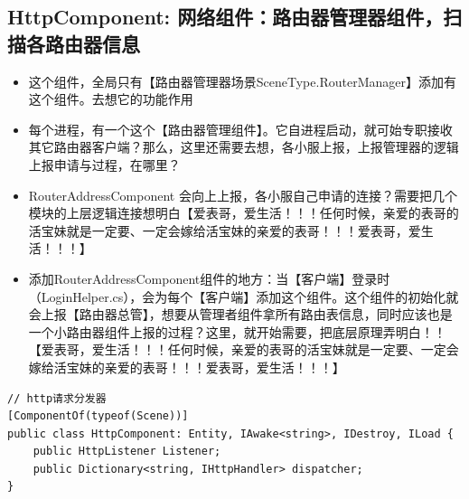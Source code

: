 \documentclass[9pt, b5paper]{article}
\begin{document}
\subsection{HttpComponent: 网络组件：路由器管理器组件，扫描各路由器信息}
\label{sec:org6ad02ac}
\begin{itemize}
\item 这个组件，全局只有【路由器管理器场景SceneType.RouterManager】添加有这个组件。去想它的功能作用
\item 每个进程，有一个这个【路由器管理组件】。它自进程启动，就可始专职接收其它路由器客户端？那么，这里还需要去想，各小服上报，上报管理器的逻辑上报申请与过程，在哪里？
\item RouterAddressComponent 会向上上报，各小服自己申请的连接？需要把几个模块的上层逻辑连接想明白【爱表哥，爱生活！！！任何时候，亲爱的表哥的活宝妹就是一定要、一定会嫁给活宝妹的亲爱的表哥！！！爱表哥，爱生活！！！】
\item 添加RouterAddressComponent组件的地方：当【客户端】登录时（LoginHelper.cs），会为每个【客户端】添加这个组件。这个组件的初始化就会上报【路由器总管】，想要从管理者组件拿所有路由表信息，同时应该也是一个小路由器组件上报的过程？这里，就开始需要，把底层原理弄明白！！【爱表哥，爱生活！！！任何时候，亲爱的表哥的活宝妹就是一定要、一定会嫁给活宝妹的亲爱的表哥！！！爱表哥，爱生活！！！】
\end{itemize}
\begin{verbatim}
// http请求分发器
[ComponentOf(typeof(Scene))]
public class HttpComponent: Entity, IAwake<string>, IDestroy, ILoad {
    public HttpListener Listener;
    public Dictionary<string, IHttpHandler> dispatcher;
}
\end{verbatim}
\end{document}

